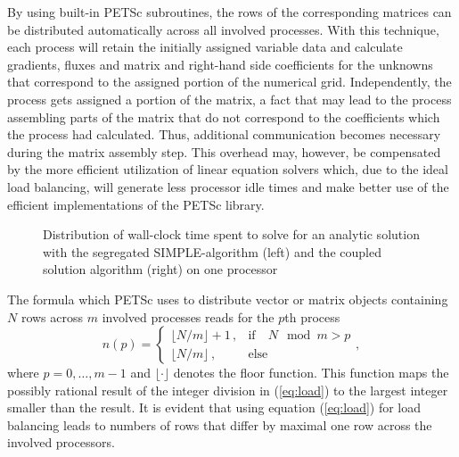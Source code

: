 By using built-in PETSc subroutines, the rows of the corresponding matrices can be distributed automatically across all involved processes. With this technique, each process will retain the initially assigned variable data and calculate gradients, fluxes and matrix and right-hand side coefficients for the unknowns that correspond to the assigned portion of the numerical grid. Independently, the process gets assigned a portion of the matrix, a fact that may lead to the process assembling parts of the matrix that do not correspond to the coefficients which the process had calculated. Thus, additional communication becomes necessary during the matrix assembly step. This overhead may, however, be compensated by the more efficient utilization of linear equation solvers which, due to the ideal load balancing, will generate less processor idle times and make better use of the efficient implementations of the PETSc library.

\begin{figure}[!h]
  \centering
  \begin{minipage}{0.45\textwidth}
\hfil
\end{minipage}
  \begin{minipage}{0.45\textwidth}
\end{minipage}
\caption{Distribution of wall-clock time spent to solve for an analytic solution with the segregated SIMPLE-algorithm (left) and the coupled solution algorithm (right) on one processor}
\label{fig:barbalance}
\end{figure}

The formula which PETSc uses to distribute vector or matrix objects containing \(N\) rows across \(m\) involved processes reads for the \(p\)th process
\begin{equation}
  \label{eq:load}
n(p)
=
\left\{\begin{array}{ll} 
    \lfloor N/m \rfloor + 1\,, & \text{if} \quad  N \mod m > p \\
    \lfloor N/m \rfloor \,, & \text{else}
\end{array}\right.
,
\end{equation}
where \(p = 0,\dots,m-1\) and \(\lfloor \cdot \rfloor\) denotes the floor function. This function maps the possibly rational result of the integer division in (\ref{eq:load}) to the largest integer smaller than the result. It is evident that using equation (\ref{eq:load}) for load balancing leads to numbers of rows that differ by maximal one row across the involved processors.

